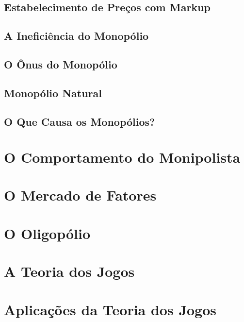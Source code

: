 \documentclass[a4paper,11pt,oneside]{book}
\theoremstyle{definition}
\theoremstyle{break}
\begin{document}
\section{Estabelecimento de Preços com Markup}



\section{A Ineficiência do Monopólio}
\section{O Ônus do Monopólio}
\section{Monopólio Natural}
\section{O Que Causa os Monopólios?}

\chapter{O Comportamento do Monipolista}

\chapter{O Mercado de Fatores}

\chapter{O Oligopólio}

\chapter{A Teoria dos Jogos}

\chapter{Aplicações da Teoria dos Jogos}

\end{document}
